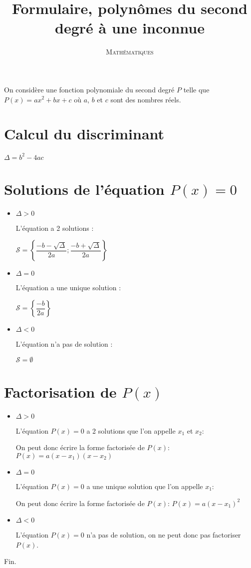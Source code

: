 \documentclass[a4paper,12pt]{scrartcl}
\date{}
\title{Formulaire, polynômes du second degré à une inconnue}
\author{\textsc{Mathématiques}}
\begin{document}
\maketitle




On considère une fonction polynomiale du second degré $P$ telle que $P(x) = ax^2 + bx + c$ où $a$, $b$ et $c$ sont des nombres réels. 

\section*{Calcul du discriminant}

$\Delta = b^2 - 4ac$

\section*{Solutions de l'équation $P(x) = 0$}

\begin{itemize}
\item $\Delta > 0$

L'équation a 2 solutions : 

$\mathcal{S} = \left\lbrace \dfrac{-b-\sqrt{\Delta}}{2a} ; \dfrac{-b+\sqrt{\Delta}}{2a} \right\rbrace$

\item $\Delta = 0$

L'équation a une unique solution :

$\mathcal{S} = \left\lbrace \dfrac{-b}{2a}\right\rbrace$

\item $\Delta < 0$

L'équation n'a pas de solution :

$\mathcal{S} = \emptyset$

\end{itemize}

\section*{Factorisation de $P(x)$}

\begin{itemize}
\item $\Delta > 0$

L'équation $P(x) = 0$ a 2 solutions que l'on appelle $x_1$ et $x_2$: 

On peut donc écrire la forme factorisée de $P(x)$: $P(x) = a(x - x_1)(x - x_2)$

\item $\Delta = 0$

L'équation $P(x) = 0$ a une unique solution que l'on appelle $x_1$:

On peut donc écrire la forme factorisée de $P(x)$: $P(x) = a(x - x_1)^2$

\item $\Delta < 0$

L'équation $P(x) = 0$ n'a pas de solution, on ne peut donc pas factoriser $P(x)$.

\end{itemize}


\trait

\begin{center}
Fin.
\end{center}
\end{document}
